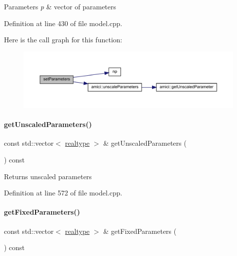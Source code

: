 \begin{DoxyParams}{Parameters}
{\em p} & vector of parameters \\
\hline
\end{DoxyParams}


Definition at line 430 of file model.\+cpp.

Here is the call graph for this function\+:
\nopagebreak
\begin{figure}[H]
\begin{center}
\leavevmode
\includegraphics[width=350pt]{classamici_1_1_model_af1e95f6479d442fcb4c63d16763d4acd_cgraph}
\end{center}
\end{figure}
\mbox{\label{classamici_1_1_model_a76f62d983fb3842cb695681f7ed9a9f0}} 
\paragraph{\texorpdfstring{getUnscaledParameters()}{getUnscaledParameters()}}
{\footnotesize\ttfamily const std\+::vector$<$ \mbox{\hyperlink{namespaceamici_a1bdce28051d6a53868f7ccbf5f2c14a3}{realtype}} $>$ \& get\+Unscaled\+Parameters (\begin{DoxyParamCaption}{ }\end{DoxyParamCaption}) const}

\begin{DoxyReturn}{Returns}
unscaled parameters 
\end{DoxyReturn}


Definition at line 572 of file model.\+cpp.

\mbox{\label{classamici_1_1_model_a76b24282a74eaca67d656149310dc07c}} 
\paragraph{\texorpdfstring{getFixedParameters()}{getFixedParameters()}}
{\footnotesize\ttfamily const std\+::vector$<$ \mbox{\hyperlink{namespaceamici_a1bdce28051d6a53868f7ccbf5f2c14a3}{realtype}} $>$ \& get\+Fixed\+Parameters (\begin{DoxyParamCaption}{ }\end{DoxyParamCaption}) const}

